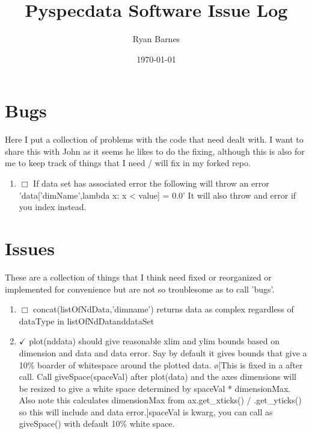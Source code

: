 \documentclass[10pt]{book}
\author{Ryan Barnes}
\title{Pyspecdata Software Issue Log}
\date{\today}
\begin{document}
\maketitle

\section{Bugs}
Here I put a collection of problems with the code that need dealt with. I want to share this with John as it seems he likes to do the fixing, although this is also for me to keep track of things that I need / will fix in my forked repo.
\begin{enumerate}
    \item $\Box$ If data set has associated error the following will throw an error 'data['dimName',lambda x: x < value] = 0.0' It will also throw and error if you index instead.
\end{enumerate}

\section{Issues}
These are a collection of things that I think need fixed or reorganized or implemented for convenience but are not so troublesome as to call 'bugs'.
\begin{enumerate}
    \item $\Box$ concat(listOfNdData,'dimname') returns data as complex regardless of dataType in listOfNdDatanddataSet
    \item $\checkmark$ plot(nddata) should give reasonable xlim and ylim bounds based on dimension and data and data error. Say by default it gives bounds that give a 10\% boarder of whitespace around the plotted data. \o[This is fixed in a after call. Call giveSpace(spaceVal) after plot(data) and the axes dimensions will be resized to give a white space determined by spaceVal * dimensionMax. Also note this calculates dimensionMax from ax.get\_xticks() / .get\_yticks() so this will include and data error.]{spaceVal is kwarg, you can call as giveSpace() with default 10\% white space.}
\end{enumerate}
\end{document}
